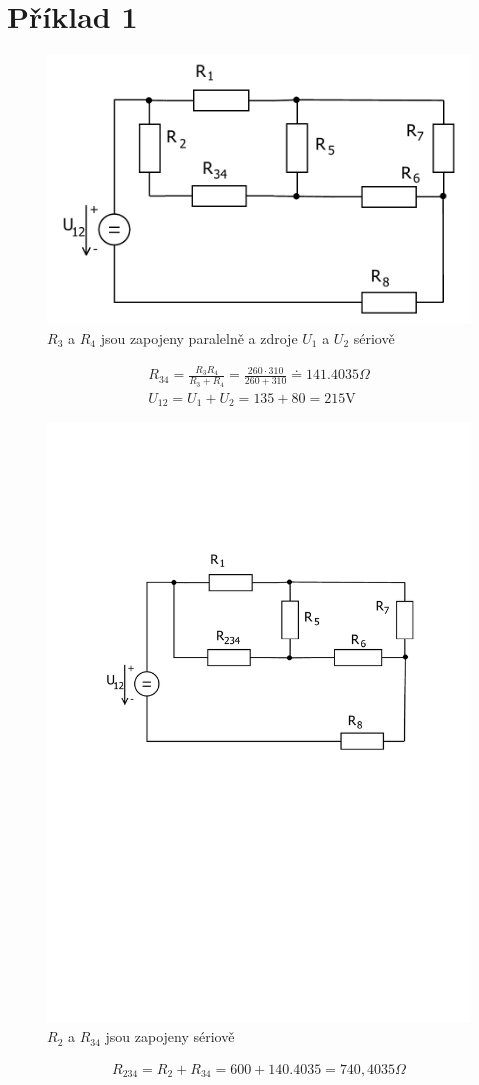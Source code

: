 \section{Příklad 1}

	\begin{figure}[H]
		\center\includegraphics[width=0.6\linewidth]{obr/1_2}
		\caption{$R_3$ a $R_4$ jsou zapojeny paralelně a zdroje $U_1$ a $U_2$ sériově }
	\end{figure}
	\begin{gather*}
		R_{34} = \frac{R_3 R_4}{R_3 + R_4} =\frac{260 \cdot 310}{260 + 310} \doteq 141.4035 \Omega \\
		U_{12} = {U_1 + U_2} = {135 + 80} = 215  \text{V}
	\end{gather*}

	\begin{figure}[H]
		\center\includegraphics[width=0.6\linewidth]{obr/1_3}
		\caption{$R_2$ a $R_{34}$ jsou zapojeny sériově}
	\end{figure}
	\begin{gather*}
		R_{234} = R_2 + R_{34} = 600 + 140.4035 = 740,4035 \Omega
		\\
	\end{gather*}
	
